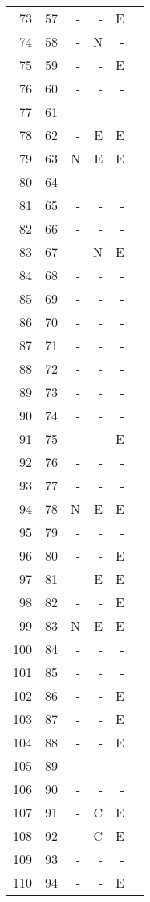 \begin{longtable}{rrrrrr}
   73 & 57 & - & - & E &  \\ 
   74 & 58 & - & N & - &  \\ 
   75 & 59 & - & - & E &  \\ 
   76 & 60 & - & - & - &  \\ 
   77 & 61 & - & - & - &  \\ 
   78 & 62 & - & E & E &  \\ 
   79 & 63 & N & E & E &  \\ 
   80 & 64 & - & - & - &  \\ 
   81 & 65 & - & - & - &  \\ 
   82 & 66 & - & - & - &  \\ 
   83 & 67 & - & N & E &  \\ 
   84 & 68 & - & - & - &  \\ 
   85 & 69 & - & - & - &  \\ 
   86 & 70 & - & - & - &  \\ 
   87 & 71 & - & - & - &  \\ 
   88 & 72 & - & - & - &  \\ 
   89 & 73 & - & - & - &  \\ 
   90 & 74 & - & - & - &  \\ 
   91 & 75 & - & - & E &  \\ 
   92 & 76 & - & - & - &  \\ 
   93 & 77 & - & - & - &  \\ 
   94 & 78 & N & E & E &  \\ 
   95 & 79 & - & - & - &  \\ 
   96 & 80 & - & - & E &  \\ 
   97 & 81 & - & E & E &  \\ 
   98 & 82 & - & - & E &  \\ 
   99 & 83 & N & E & E &  \\ 
  100 & 84 & - & - & - &  \\ 
  101 & 85 & - & - & - &  \\ 
  102 & 86 & - & - & E &  \\ 
  103 & 87 & - & - & E &  \\ 
  104 & 88 & - & - & E &  \\ 
  105 & 89 & - & - & - &  \\ 
  106 & 90 & - & - & - &  \\ 
  107 & 91 & - & C & E &  \\ 
  108 & 92 & - & C & E &  \\ 
  109 & 93 & - & - & - &  \\ 
  110 & 94 & - & - & E &  \\ 

\end{longtable}
